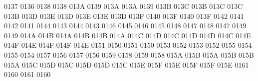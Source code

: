  0137 0136 %
 0138 0138 %
 013A 0139 %
\setcclcuc 013A 013A 0139 %
\setcclcuc 013B 013C 013B %
\setcclcuc 013C 013C 013B %
\setcclcuc 013D 013E 013D %
\setcclcuc 013E 013E 013D %
\setcclcuc 013F 0140 013F %
 0140 013F %
 0142 0141 %
 0142 0141 %
 0144 0143 %
 0144 0143 %
 0146 0145 %
 0146 0145 %
 0148 0147 %
 0148 0147 %
 0149 0149 %
\setcclcuc 014A 014B 014A %
\setcclcuc 014B 014B 014A %
\setcclcuc 014C 014D 014C %
\setcclcuc 014D 014D 014C %
\setcclcuc 014E 014F 014E %
\setcclcuc 014F 014F 014E %
 0151 0150 %
 0151 0150 %
 0153 0152 %
 0153 0152 %
 0155 0154 %
 0155 0154 %
 0157 0156 %
 0157 0156 %
 0159 0158 %
 0159 0158 %
\setcclcuc 015A 015B 015A %
\setcclcuc 015B 015B 015A %
\setcclcuc 015C 015D 015C %
\setcclcuc 015D 015D 015C %
\setcclcuc 015E 015F 015E %
\setcclcuc 015F 015F 015E %
 0161 0160 %
 0161 0160 %
